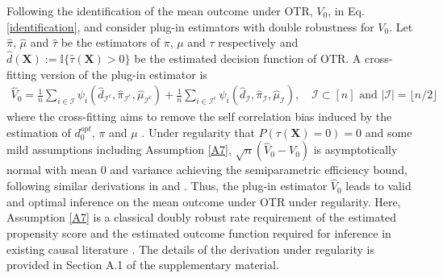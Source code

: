 \documentclass[11pt]{article}
\theoremstyle{referenceplain}
\theoremstyle{referencedefinition}
\theoremstyle{referenceremark}
\begin{document}
Following the identification of the mean outcome under OTR, $V_0$, in Eq. \eqref{identification},  \citet{zhang2012robust} and \citet{zhang2013robust} consider plug-in estimators with double robustness for $V_0$. Let $\widehat{\pi}$, $\widehat{\mu}$ and $\widehat{\tau}$ be the estimators of $\pi$, $\mu$ and $\tau$ respectively and $\widehat{d}(\mathbf{X}):=\mathbb{I}\{\widehat{\tau}(\mathbf{X})>0\}$ be the estimated decision function of OTR. A cross-fitting version of the plug-in estimator is  
\begin{align}\label{plug-in estimator}
    \widehat{V}_0=\frac{1}{n}\sum_{i\in\mathcal{I}} \psi_i\left(\widehat{d}_{\mathcal{I}^c}, \widehat{\pi}_{\mathcal{I}^c}, \widehat{\mu}_{\mathcal{I}^c}\right)+\frac{1}{n}\sum_{i\in\mathcal{I}^c} \psi_i\left(\widehat{d}_{\mathcal{I}}, \widehat{\pi}_{\mathcal{I}}, \widehat{\mu}_{\mathcal{I}}\right),\quad \mathcal{I}\subset[n] \text{ and } |\mathcal{I}|=\lfloor n/2\rfloor
\end{align}
where the cross-fitting aims to remove the self correlation bias induced by the estimation of $d^{o p t}_0$, $\pi$ and $\mu$ \citep{chernozhukov2018double}. Under regularity that $P(\tau(\mathbf{X})=0)=0$ and some mild assumptions including Assumption \ref{A7}, $\sqrt{n}(\widehat{V}_{0}-V_0)$ is asymptotically normal with mean 0 and variance achieving the semiparametric efficiency bound, following similar derivations in \citet{luedtke2016statistical} and \citet{van2014targeted}. Thus, the plug-in estimator $\widehat{V}_0$ leads to valid and optimal inference on the mean outcome under OTR under regularity. Here, Assumption \ref{A7} is a classical doubly robust rate requirement of the estimated propensity score and the estimated outcome function required for inference in existing causal literature \citep{chernozhukov2018double}. The details of the derivation under regularity is provided in Section A.1 of the supplementary material. 

\end{document}
